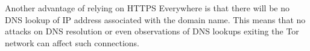 \documentclass[10pt, conference, compsocconf]{styles/IEEEtran}
\begin{document}

Another advantage of relying on HTTPS Everywhere is that there will
be no DNS lookup of IP address associated with the domain name.
This means that no attacks on DNS resolution or even observations
of DNS lookups exiting the Tor network can affect such connections.

%
\end{document}

